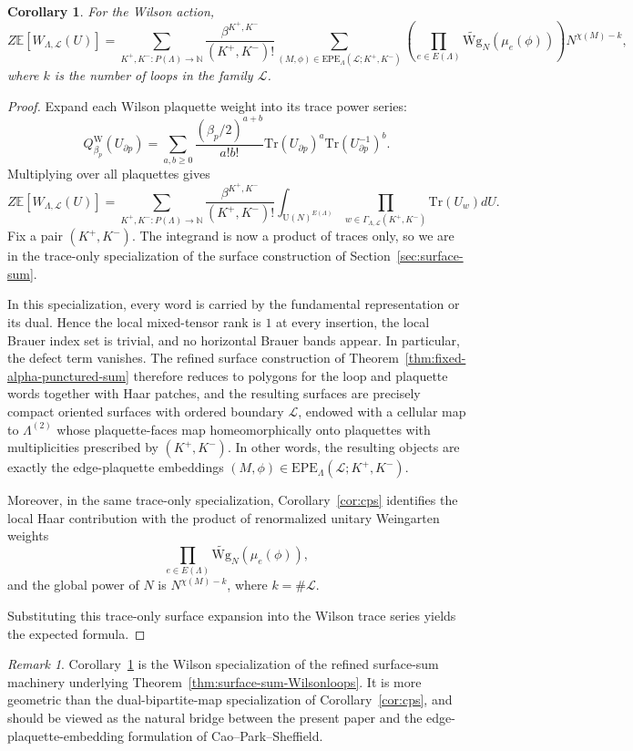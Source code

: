 \documentclass[11pt,a4paper,reqno]{article}
\newtheorem{corollary}[theorem]{Corollary}
\theoremstyle{definition}
\theoremstyle{remark}
\newtheorem{remark}[theorem]{Remark}
\newcommand\U{{\mathrm U}}
\newcommand\Tr{\mathrm{Tr}}
\newcommand\E{\mathbb{E}}
\newcommand\Lc{{\mathcal{L}}}
\newcommand\EPE{{\mathrm{EPE}}}
\begin{document}
\begin{corollary}
\label{cor:wilson-epe}
For the Wilson action,
\[
Z\E[W_{\Lambda,\Lc}(U)]=\sum_{K^+,K^-:P(\Lambda)\to \mathbb N}\frac{\beta^{K^+,K^-}}{(K^+,K^-)!}\sum_{(M,\phi)\in \EPE_{\Lambda}(\Lc;K^+,K^-)}\left(\prod_{e\in E(\Lambda)}\widetilde{\mathrm{Wg}}_N(\mu_e(\phi))\right)N^{\chi(M)-k},
\]
where $k$ is the number of loops in the family $\Lc$.
\end{corollary}

\begin{proof}
Expand each Wilson plaquette weight into its trace power series:
\[
Q_{\beta_p}^{\mathrm W}(U_{\partial p})=\sum_{a,b\ge 0}\frac{(\beta_p/2)^{a+b}}{a!b!}\Tr(U_{\partial p})^a \Tr(U_{\partial p}^{-1})^b.
\]
Multiplying over all plaquettes gives
\[
Z\E[W_{\Lambda,\Lc}(U)]=\sum_{K^+,K^-:P(\Lambda)\to \mathbb N}\frac{\beta^{K^+,K^-}}{(K^+,K^-)!}\int_{\U(N)^{E(\Lambda)}}\prod_{w\in \Gamma_{\Lambda,\Lc}(K^+,K^-)}\Tr(U_w) dU.
\]
Fix a pair $(K^+,K^-)$. The integrand is now a product of traces only, so we are in the trace-only specialization of the surface construction of Section~\ref{sec:surface-sum}.

In this specialization, every word is carried by the fundamental representation or its dual. Hence the local mixed-tensor rank is $1$ at every insertion, the local Brauer index set is trivial, and no horizontal Brauer bands appear. In particular, the defect term vanishes. The refined surface construction of Theorem~\ref{thm:fixed-alpha-punctured-sum} therefore reduces to polygons for the loop and plaquette words together with Haar patches, and the resulting surfaces are precisely compact oriented surfaces with ordered boundary $\Lc$, endowed with a cellular map to $\Lambda^{(2)}$ whose plaquette-faces map homeomorphically onto plaquettes with multiplicities prescribed by $(K^+,K^-)$. In other words, the resulting objects are exactly the edge-plaquette embeddings $(M,\phi)\in \EPE_{\Lambda}(\Lc;K^+,K^-)$.

Moreover, in the same trace-only specialization, Corollary~\ref{cor:cps} identifies the local Haar contribution with the product of renormalized unitary Weingarten weights
\[
\prod_{e\in E(\Lambda)} \widetilde{\mathrm{Wg}}_N(\mu_e(\phi)),
\]
and the global power of $N$ is $N^{\chi(M)-k}$, where $k=\#\Lc$.

Substituting this trace-only surface expansion into the Wilson trace series yields the expected formula.
\end{proof}

\begin{remark}
Corollary~\ref{cor:wilson-epe} is the Wilson specialization of the refined surface-sum machinery underlying Theorem~\ref{thm:surface-sum-Wilsonloops}. It is more geometric than the dual-bipartite-map specialization of Corollary~\ref{cor:cps}, and should be viewed as the natural bridge between the present paper and the edge-plaquette-embedding formulation of Cao--Park--Sheffield.
\end{remark}
\end{document}
